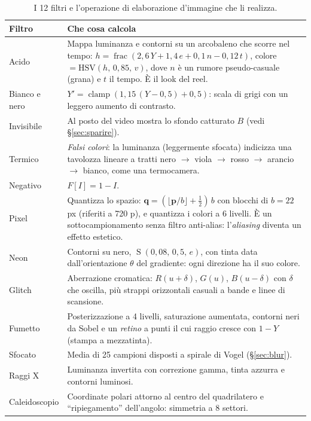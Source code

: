 \documentclass[11pt,a4paper]{article}
\newcommand{\Sm}{\operatorname{S}}
\newcommand{\clamp}{\operatorname{clamp}}
\newcommand{\vect}[1]{\mathbf{#1}}
\begin{document}
\begin{table}[htbp]
\centering
\small
\begin{tabular}{@{}l>{\raggedright\arraybackslash}p{11.2cm}@{}}
\toprule
\textbf{Filtro} & \textbf{Che cosa calcola} \\
\midrule
Acido & Mappa luminanza e contorni su un arcobaleno che scorre nel tempo:
  $h=\operatorname{frac}(2{,}6\,Y+1{,}4\,e+0{,}1\,n-0{,}12\,t)$, colore $=\mathrm{HSV}(h,\,0{,}85,\,v)$,
  dove $n$ è un rumore pseudo-casuale (grana) e $t$ il tempo. È il look del reel. \\
Bianco e nero & $Y'=\clamp(1{,}15\,(Y-0{,}5)+0{,}5)$: scala di grigi con un leggero aumento di contrasto. \\
Invisibile & Al posto del video mostra lo sfondo catturato $B$ (vedi \S\ref{sec:sparire}). \\
Termico & \emph{Falsi colori}: la luminanza (leggermente sfocata) indicizza una tavolozza lineare a
  tratti nero $\to$ viola $\to$ rosso $\to$ arancio $\to$ bianco, come una termocamera. \\
Negativo & $F[I]=1-I$. \\
Pixel & Quantizza lo spazio: $\vect{q}=(\lfloor\vect{p}/b\rfloor+\tfrac12)\,b$ con blocchi di
  $b=22$ px (riferiti a 720 p), e quantizza i colori a 6 livelli. È un sottocampionamento senza
  filtro anti-alias: l'\emph{aliasing} diventa un effetto estetico. \\
Neon & Contorni su nero, $\Sm(0{,}08,\,0{,}5,\,e)$, con tinta data dall'orientazione $\theta$
  del gradiente: ogni direzione ha il suo colore. \\
Glitch & Aberrazione cromatica: $R(u+\delta)$, $G(u)$, $B(u-\delta)$ con $\delta$ che oscilla, più
  strappi orizzontali casuali a bande e linee di scansione. \\
Fumetto & Posterizzazione a 4 livelli, saturazione aumentata, contorni neri da Sobel e un
  \emph{retino} a punti il cui raggio cresce con $1-Y$ (stampa a mezzatinta). \\
Sfocato & Media di 25 campioni disposti a spirale di Vogel (\S\ref{sec:blur}). \\
Raggi X & Luminanza invertita con correzione gamma, tinta azzurra e contorni luminosi. \\
Caleidoscopio & Coordinate polari attorno al centro del quadrilatero e ``ripiegamento''
  dell'angolo: simmetria a 8 settori. \\
\bottomrule
\end{tabular}
\caption{I 12 filtri e l'operazione di elaborazione d'immagine che li realizza.}
\end{table}
\end{document}
